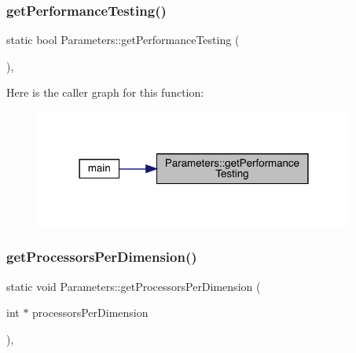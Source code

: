 \subsubsection{\texorpdfstring{getPerformanceTesting()}{getPerformanceTesting()}}
{\footnotesize\ttfamily static bool Parameters\+::get\+Performance\+Testing (\begin{DoxyParamCaption}{ }\end{DoxyParamCaption})\hspace{0.3cm}{\ttfamily [inline]}, {\ttfamily [static]}}

Here is the caller graph for this function\+:
\nopagebreak
\begin{figure}[H]
\begin{center}
\leavevmode
\includegraphics[width=298pt]{class_parameters_a778a2311c27854392c34c15bd4ea19f8_icgraph}
\end{center}
\end{figure}
\mbox{\label{class_parameters_a6b13faa642ebaf458203ae111a536d7a}} 
\subsubsection{\texorpdfstring{getProcessorsPerDimension()}{getProcessorsPerDimension()}}
{\footnotesize\ttfamily static void Parameters\+::get\+Processors\+Per\+Dimension (\begin{DoxyParamCaption}\item[{int $\ast$}]{processors\+Per\+Dimension }\end{DoxyParamCaption})\hspace{0.3cm}{\ttfamily [inline]}, {\ttfamily [static]}}

\mbox{\label{class_parameters_a92d9e73e333b01745747e55d9ae4f7cc}} 
